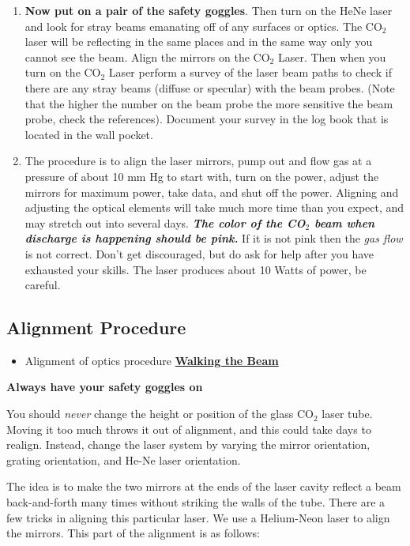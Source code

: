 \documentclass{../lab}
\begin{document}
\begin{enumerate}
    \item \textbf{Now put on a pair of the safety goggles}. Then turn on the HeNe laser and look for stray beams emanating off of any surfaces or optics. The CO$_2$ laser will be reflecting in the same places and in the same way only you cannot see the beam. Align the mirrors on the CO$_2$ Laser. Then when you turn on the CO$_2$ Laser perform a survey of the laser beam paths to check if there are any stray beams (diffuse or specular) with the beam probes. (Note that the higher the number on the beam probe the more sensitive the beam probe, check the references). Document your survey in the log book that is located in the wall pocket.

    \item The procedure is to align the laser mirrors, pump out and flow gas at a pressure of about 10 mm Hg to start with, turn on the power, adjust the mirrors for maximum power, take data, and shut off the power. Aligning and adjusting the optical elements will take much more time than you expect, and may stretch out into several days.\emph{\textbf{ The color of the CO$_2$ beam when discharge is happening should be pink.}}  If it is not pink then the \emph{gas flow} is not correct. Don't get discouraged, but do ask for help after you have exhausted your skills. The laser produces about 10 Watts of power, be careful.
\end{enumerate}

\subsection{Alignment Procedure}

\begin{itemize}
    \item Alignment of optics procedure \href{http://physics111.lib.berkeley.edu/Physics111/Reprints/CO2/Walking\%20the\%20Beam.pdf}{\textbf{Walking the Beam}}
\end{itemize}

\textbf{Always have your safety goggles on}

You should \emph{never} change the height or position of the glass CO$_2$ laser tube. Moving it too much throws it out of alignment, and this could take days to realign. Instead, change the laser system by varying the mirror orientation, grating orientation, and He-Ne laser orientation.

The idea is to make the two mirrors at the ends of the laser cavity reflect a beam back-and-forth many times without striking the walls of the tube. There are a few tricks in aligning this particular laser. We use a Helium-Neon laser to align the mirrors. This part of the alignment is as follows:
\end{document}
